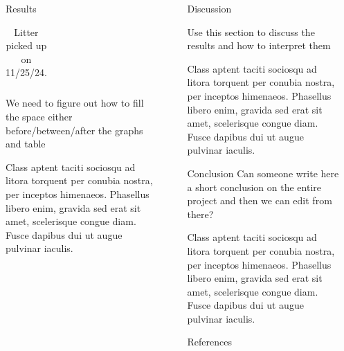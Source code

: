 \documentclass[final]{beamer}
\newlength{\sepwidth}
\newlength{\colwidth}
\newcommand{\separatorcolumn}{\begin{column}{\sepwidth}\end{column}}
\begin{document}
\begin{frame}[t]
\begin{columns}[t]
\begin{column}{\colwidth}
\begin{block}{Results}
\begin{table}
\begin{tabular}{l r }
              \bottomrule
            \end{tabular}
            \caption{Litter picked up on 11/25/24.}
          \end{table}



          We need to figure out how to fill the space either before/between/after the graphs and table\par
          Class aptent taciti sociosqu ad litora torquent per conubia nostra, per
          inceptos himenaeos. Phasellus libero enim, gravida sed erat sit amet,
          scelerisque congue diam. Fusce dapibus dui ut augue pulvinar iaculis.
        \end{block}

      \end{column}

      \separatorcolumn

      \begin{column}{\colwidth}

        \begin{block}{Discussion}


          Use this section to discuss the results and how to interpret them \par
          Class aptent taciti sociosqu ad litora torquent per conubia nostra, per
          inceptos himenaeos. Phasellus libero enim, gravida sed erat sit amet,
          scelerisque congue diam. Fusce dapibus dui ut augue pulvinar iaculis.

        \end{block}

        \begin{block}{Conclusion}
          Can someone write here a short conclusion on the entire project and then we can edit from there? \par
          Class aptent taciti sociosqu ad litora torquent per conubia nostra, per
          inceptos himenaeos. Phasellus libero enim, gravida sed erat sit amet,
          scelerisque congue diam. Fusce dapibus dui ut augue pulvinar iaculis.

        \end{block}

        \begin{block}{References}

          \nocite{*}
          \footnotesize{}

        \end{block}  
      \end{column}

      \separatorcolumn
    \end{columns}
  \end{frame}
\end{document}
